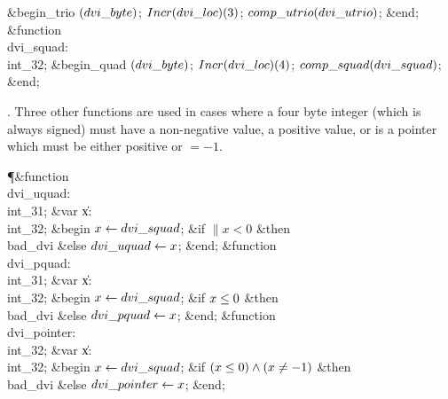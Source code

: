 \&{begin\_trio} $(\\{dvi\_byte})$;\5
$\\{Incr}(\\{dvi\_loc})(3)$;\5
$\\{comp\_utrio}(\\{dvi\_utrio})$;\6
\&{end};\7
\4\&{function}\1\  \\{dvi\_squad}: \\{int\_32};\2\6
\&{begin\_quad} $(\\{dvi\_byte})$;\5
$\\{Incr}(\\{dvi\_loc})(4)$;\5
$\\{comp\_squad}(\\{dvi\_squad})$;\6
\&{end};\par
\fi

. Three other functions are used in cases where a four byte integer
(which is always signed) must have a non-negative value, a positive
value, or is a pointer which must be either positive or $=-1$.

\Y\P\4\&{function}\1\  \\{dvi\_uquad}: \\{int\_31};\6
\4\&{var} \|x: \\{int\_32};\2\6
\&{begin} $\hbox{$x$}\gets\\{dvi\_squad}$;\6
\&{if} $\|x<0$ \1\&{then}\5
\\{bad\_dvi}\6
\4\&{else} $\\{dvi\_uquad}\gets\hbox{$x$}$;\2\6
\&{end};\7
\4\&{function}\1\  \\{dvi\_pquad}: \\{int\_31};\6
\4\&{var} \|x: \\{int\_32};\2\6
\&{begin} $\hbox{$x$}\gets\\{dvi\_squad}$;\6
\&{if} $\hbox{$x$}\le0$ \1\&{then}\5
\\{bad\_dvi}\6
\4\&{else} $\\{dvi\_pquad}\gets\hbox{$x$}$;\2\6
\&{end};\7
\4\&{function}\1\  \\{dvi\_pointer}: \\{int\_32};\6
\4\&{var} \|x: \\{int\_32};\2\6
\&{begin} $\hbox{$x$}\gets\\{dvi\_squad}$;\6
\&{if} $(\hbox{$x$}\le0)\land(\hbox{$x$}\ne-1)$ \1\&{then}\5
\\{bad\_dvi}\6
\4\&{else} $\\{dvi\_pointer}\gets\hbox{$x$}$;\2\6
\&{end};\par
\fi

